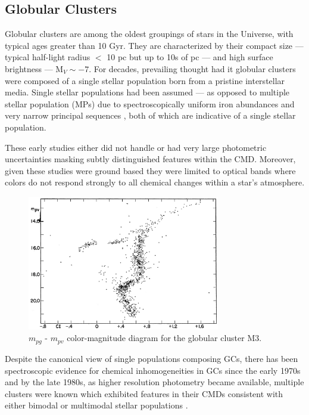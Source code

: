 \subsection{Globular Clusters}
Globular clusters \citep[GC,][]{Herschel1814} are among the oldest groupings of
stars in the Universe, with typical ages greater than 10 Gyr. They are
characterized by their compact size --- typical half-light radius $<$ 10 pc but
up to 10s of pc --- and high surface brightness --- M$_{V} \sim -7$. For
decades, prevailing thought had it globular clusters were composed of a single
stellar population born from a pristine interstellar media. Single stellar
populations had been assumed --- as opposed to multiple stellar population
(MPs) due to spectroscopically uniform iron abundances \citep{Gratton2012} and
very narrow principal sequences \citep[e.g. Figure \ref{fig:M3CMD} taken
from][]{Sandage1953, Stetson1988}, both of which are indicative of a single
stellar population.  

These early studies either did not handle or had very large photometric
uncertainties masking subtly distinguished features within the CMD. Moreover,
given these studies were ground based they were limited to optical bands where
colors do not respond strongly to all chemical changes within a star's
atmosphere.

\begin{figure}
	\centering
	\includegraphics[width=0.75\textwidth]{src/Figures/Gould53.png}
	\caption{$m_{pg}$ - $m_{pv}$ color-magnitude diagram for the globular cluster M3.}
	\label{fig:M3CMD}
\end{figure}

Despite the canonical view of single populations composing GCs, there has been
spectroscopic evidence for chemical inhomogeneities in GCs since the early
1970s \citep[e.g.][]{Osborn1971} and by the late 1980s, as higher resolution
photometry became available, multiple clusters were known which exhibited
features in their CMDs consistent with either bimodal or multimodal stellar
populations \citep[e.g.][]{Norris1987}.


